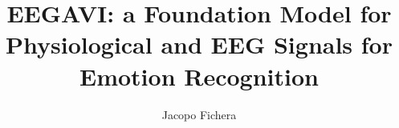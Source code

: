 \documentclass[a4paper,12pt]{article}
\begin{document}
    \title{EEGAVI: a Foundation Model for Physiological and EEG Signals for Emotion Recognition}
    \author{Jacopo Fichera}
    \maketitle

    
    \newpage
    \tableofcontents
    \newpage

    
    \newpage
    
    \newpage
    
    \newpage
    
    \newpage
    
    \newpage

    

    \appendix
    
\end{document}
